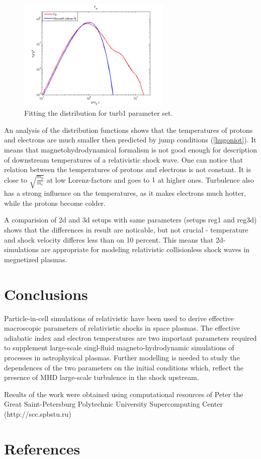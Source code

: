\documentclass[a4paper]{jpconf}
\begin{document}
	\begin{figure}[h!]
		\centering
		\includegraphics[width=0.65\textwidth]{fig/temperature_fit.png} 
		\caption{Fitting the distribution for turb1 parameter set.}
		\label{temp_fit}
	\end{figure}
	
	An analysis of the distribution functions shows that the temperatures of protons and electrons are much smaller then predicted by jump conditions (\ref{hugoniot}). It means that magnetohydrodynamical formalism is not good enough for description of downstream temperatures of a relativistic shock wave. One can notice that relation between the temperatures of protons and electrons is not constant. It is close to $\sqrt{\frac{m_p}{m_e}}$ at low Lorenz-factors and goes to $1$ at higher ones. Turbulence also has a strong influence on the temperatures, as it makes electrons much hotter, while the protons become colder.
	
	A comparision of 2d and 3d setups with same parameters (setups reg1 and reg3d) shows that the differences in result are noticable, but not crucial - temperature and shock velocity differes less than on 10 percent. This means that 2d-simulations are appropriate for modeling relativistic collisionless shock waves in megnetized plasmas.
	
	\section{Conclusions}
	
	Particle-in-cell simulations of relativistic have been used to derive effective macroscopic parameters of relativistic shocks in space plasmas. The effective adiabatic index and electron temperatures are two important parameters required to supplement large-scale singl-fluid magneto-hydrodynamic simulations of processes in astrophysical plasmas. Further modelling is needed to study the dependences of the two parameters  on the initial conditions which, reflect the presence of MHD large-scale turbulence in the shock upstream.
	
	\ack
	Results of the work were obtained using computational resources of Peter the Great Saint-Petersburg Polytechnic University Supercomputing Center (http://scc.spbstu.ru)
	
	\section*{References}
	
	
	
\end{document}
